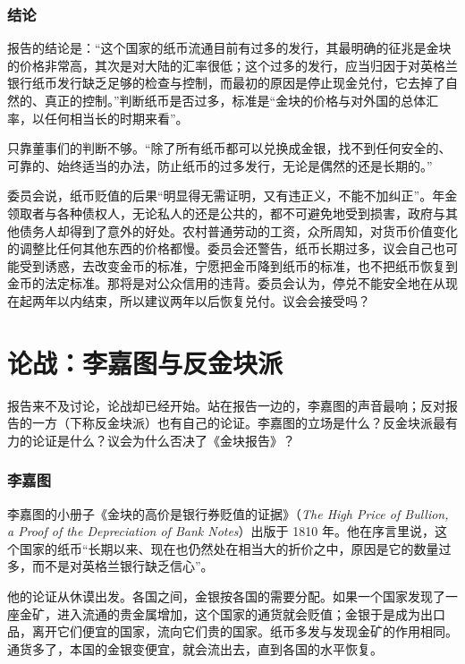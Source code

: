 \subsubsection{结论}
报告的结论是：“这个国家的纸币流通目前有过多的发行，其最明确的征兆是金块的价格非常高，其次是对大陆的汇率很低；这个过多的发行，应当归因于对英格兰银行纸币发行缺乏足够的检查与控制，而最初的原因是停止现金兑付，它去掉了自然的、真正的控制。”\cite{bullion1810}判断纸币是否过多，标准是“金块的价格与对外国的总体汇率，以任何相当长的时期来看”\cite{bullion1810}。

只靠董事们的判断不够。“除了所有纸币都可以兑换成金银，找不到任何安全的、可靠的、始终适当的办法，防止纸币的过多发行，无论是偶然的还是长期的。”\cite{bullion1810}

委员会说，纸币贬值的后果“明显得无需证明，又有违正义，不能不加纠正”\cite{bullion1810}。年金领取者与各种债权人，无论私人的还是公共的，都不可避免地受到损害，政府与其他债务人却得到了意外的好处\cite{bullion1810}。农村普通劳动的工资，众所周知，对货币价值变化的调整比任何其他东西的价格都慢\cite{bullion1810}。委员会还警告，纸币长期过多，议会自己也可能受到诱惑，去改变金币的标准，宁愿把金币降到纸币的标准，也不把纸币恢复到金币的法定标准。那将是对公众信用的违背\cite{bullion1810}。委员会认为，停兑不能安全地在从现在起两年以内结束，所以建议两年以后恢复兑付\cite{bullion1810}。议会会接受吗？

\section{论战：李嘉图与反金块派}\label{sec:bullion-debate}

报告来不及讨论，论战却已经开始。站在报告一边的，李嘉图的声音最响；反对报告的一方（下称反金块派）也有自己的论证。李嘉图的立场是什么？反金块派最有力的论证是什么？议会为什么否决了《金块报告》？

\subsubsection{李嘉图}
李嘉图的小册子《金块的高价是银行券贬值的证据》（\emph{The High Price of Bullion, a Proof of the Depreciation of Bank Notes}）出版于 1810 年。他在序言里说，这个国家的纸币“长期以来、现在也仍然处在相当大的折价之中，原因是它的数量过多，而不是对英格兰银行缺乏信心”\cite{ricardo1810}。

他的论证从休谟出发。各国之间，金银按各国的需要分配。如果一个国家发现了一座金矿，进入流通的贵金属增加，这个国家的通货就会贬值；金银于是成为出口品，离开它们便宜的国家，流向它们贵的国家\cite{ricardo1810}。纸币多发与发现金矿的作用相同。通货多了，本国的金银变便宜，就会流出去，直到各国的水平恢复。

